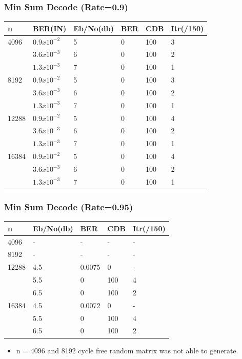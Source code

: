 \documentclass[xcolor=dvipsname]
{beamer}
\begin{document}
\begin{frame}[t] 
\frametitle{Min Sum Decode (Rate=0.9)}

\begin{table}[]
\centering
\begin{tabular}{|l|l|l|l|l|l|}
\hline
n     & BER(IN) & Eb/No(db) & BER & CDB & Itr(/150) \\ \hline
4096  & $0.9x10^{-2}$ & 5     & 0   & 100 & 3         \\ 
      & $3.6x10^{-3}$ & 6     & 0   & 100 & 2         \\ 
      & $1.3x10^{-3}$ & 7     & 0   & 100 & 1         \\ \hline
8192  & $0.9x10^{-2}$ & 5     & 0   & 100 & 3         \\ 
      & $3.6x10^{-3}$ & 6     & 0   & 100 & 2         \\ 
      & $1.3x10^{-3}$ & 7     & 0   & 100 & 1         \\ \hline
12288 & $0.9x10^{-2}$ & 5     & 0   & 100 & 4         \\ 
      & $3.6x10^{-3}$ & 6     & 0   & 100 & 2         \\ 
      & $1.3x10^{-3}$ & 7     & 0   & 100 & 1         \\ \hline
16384 & $0.9x10^{-2}$ & 5     & 0   & 100 & 4         \\ 
      & $3.6x10^{-3}$ & 6     & 0   & 100 & 2         \\ 
      & $1.3x10^{-3}$ & 7     & 0   & 100 & 1         \\ \hline
\end{tabular}
\end{table}

\end{frame}


\begin{frame}[t] 
\frametitle{Min Sum Decode (Rate=0.95)}

\begin{table}[]
\centering
\begin{tabular}{|l|l|l|l|l|}
\hline
n     & Eb/No(db) & BER    & CDB & Itr(/150) \\ \hline
4096  & -     & -      & -   & -         \\ \hline
8192  & -     & -      & -   & -         \\ \hline
12288 & 4.5   & 0.0075 & 0   & -         \\ 
      & 5.5   & 0      & 100 & 4         \\ 
      & 6.5   & 0      & 100 & 2         \\ \hline
16384 & 4.5   & 0.0072 & 0   & -         \\ 
      & 5.5   & 0      & 100 & 4         \\ 
      & 6.5   & 0      & 100 & 2         \\ \hline
\end{tabular}
\end{table}
\begin{itemize}
\item n = 4096 and 8192 cycle free random matrix was not able to generate. 
\end{itemize}
\end{frame}

\end{document}
